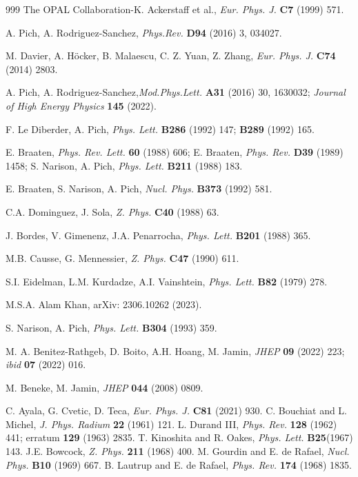 \begin{thebibliography}{999}
 The OPAL Collaboration-K. Ackerstaff et al., {\it Eur. Phys. J.} {\bf C7} (1999) 571.

 A. Pich, A. Rodriguez-Sanchez, {\it Phys.Rev.} {\bf D94} (2016) 3, 034027.


 M. Davier, A. H\"ocker, B. Malaescu, C. Z. Yuan, Z. Zhang, {\it Eur. Phys. J.} {\bf C74} (2014) 2803.

 A. Pich, A. Rodriguez-Sanchez,{\it Mod.Phys.Lett.} {\bf A31} (2016) 30, 1630032; {\it Journal of High Energy Physics} {\bf  145} (2022).

 F. Le Diberder,  A. Pich, {\it Phys. Lett.} {\bf B286} (1992) 147; {\bf B289} 
(1992) 165.

E. Braaten, {\it Phys. Rev. Lett.} {\bf 60} (1988) 606; E. Braaten, {\it Phys. Rev.} {\bf D39} (1989) 1458; S. Narison, A. Pich, {\it Phys. Lett.} {\bf B211} (1988) 183.

E. Braaten, S. Narison, A. Pich, {\it Nucl. Phys.} {\bf B373} (1992) 581.




 C.A. Dominguez, J. Sola, {\it  Z. Phys.} {\bf C40} (1988) 63.

 J. Bordes, V. Gimenenz, J.A. Penarrocha, {\it Phys. Lett.} {\bf B201} (1988) 365.

 M.B. Causse, G. Mennessier, {\it  Z. Phys.} {\bf C47} (1990) 611.

 S.I. Eidelman, L.M. Kurdadze, A.I. Vainshtein,  {\it Phys. Lett.} {\bf B82} (1979) 278.

 M.S.A. Alam Khan, arXiv: 2306.10262 (2023).

  S. Narison,  A. Pich, {\it Phys. Lett.} {\bf B304} (1993) 359.
 
  M. A. Benitez-Rathgeb, D. Boito,  A.H. Hoang, M. Jamin, {\it JHEP} {\bf 09} (2022) 223;
 {\it ibid} {\bf 07} (2022) 016.
 
  M. Beneke, M. Jamin, {\it JHEP} {\bf 044} (2008) 0809.
  
  C. Ayala, G. Cvetic, D. Teca, {\it Eur. Phys. J.} {\bf C81}  (2021) 930.
 C. Bouchiat and L. Michel, {\it J. Phys. Radium} {\bf 22}
(1961) 121.
 L. Durand III, {\it Phys. Rev.} {\bf 128} (1962) 441; erratum {\bf 129} (1963) 2835.
T. Kinoshita and R. Oakes, {\it Phys. Lett.} {\bf B25}(1967) 143.
J.E. Bowcock, {\it Z. Phys.} {\bf 211} (1968) 400.
M. Gourdin and E. de Rafael, {\it Nucl. Phys.} {\bf B10} (1969) 667.
B. Lautrup and E. de Rafael, {\it Phys. Rev.} {\bf 174} (1968) 1835.


\end{thebibliography}
